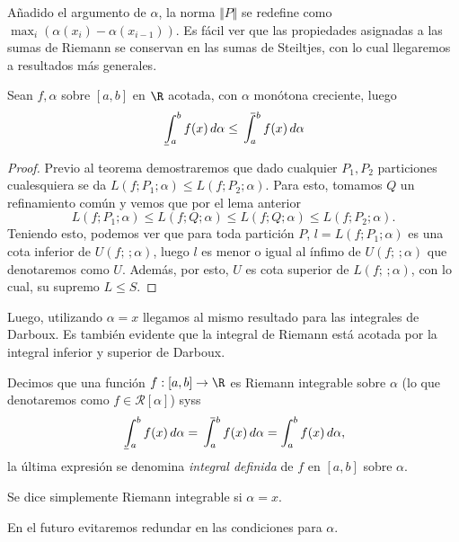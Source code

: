 \documentclass[11pt,oneside,a4paper]{book}
\def\upint{\mathchoice%
    {\mkern13mu\overline{\vphantom{\intop}\mkern7mu}\mkern-20mu}%
    {\mkern7mu\overline{\vphantom{\intop}\mkern7mu}\mkern-14mu}%
    {\mkern7mu\overline{\vphantom{\intop}\mkern7mu}\mkern-14mu}%
    {\mkern7mu\overline{\vphantom{\intop}\mkern7mu}\mkern-14mu}%
  \int}
\def\lowint{\mkern3mu\underline{\vphantom{\intop}\mkern7mu}\mkern-10mu\int}
\begin{document}
Añadido el argumento de $\alpha$, la norma $\Vert P\Vert$ se redefine como $\max_i(\alpha(x_i)-\alpha(x_{i-1}))$. Es fácil ver que las propiedades asignadas a las sumas de Riemann se conservan en las sumas de Steiltjes, con lo cual llegaremos a resultados más generales.
\begin{thm}
Sean $f,\alpha$ sobre $[a,b]$ en $\R$ acotada, con $\alpha$ monótona creciente, luego
$$\lowint_a^bf(x)\,d\alpha\leq\upint_a^bf(x)\,d\alpha$$
\end{thm}
\begin{proof}
Previo al teorema demostraremos que dado cualquier $P_1,P_2$ particiones cualesquiera se da $L(f;P_1;\alpha)\leq L(f;P_2;\alpha)$. Para esto, tomamos $Q$ un refinamiento común y vemos que por el lema anterior
$$L(f;P_1;\alpha)\leq L(f;Q;\alpha)\leq L(f;Q;\alpha)\leq L(f;P_2;\alpha).$$
Teniendo esto, podemos ver que para toda partición $P$, $l=L(f;P_1;\alpha)$ es una cota inferior de $U(f;\,;\alpha)$, luego $l$ es menor o igual al ínfimo de $U(f;\,;\alpha)$ que denotaremos como $U$. Además, por esto, $U$ es cota superior de $L(f;\,;\alpha)$, con lo cual, su supremo $L\leq S$.
\end{proof}
Luego, utilizando $\alpha=x$ llegamos al mismo resultado para las integrales de Darboux. Es también evidente que la integral de Riemann está acotada por la integral inferior y superior de Darboux.
\begin{mydef}
Decimos que una función $f:[a,b]\rightarrow\R$ es Riemann integrable sobre $\alpha$ (lo que denotaremos como $f\in\mathscr{R}[\alpha]$) syss
$$\lowint_a^bf(x)\,d\alpha=\upint_a^bf(x)\,d\alpha=\int_a^bf(x)\,d\alpha,$$
la última expresión se denomina \textit{integral definida} de $f$ en $[a,b]$ sobre $\alpha$.

Se dice simplemente Riemann integrable si $\alpha=x$.
\end{mydef}
En el futuro evitaremos redundar en las condiciones para $\alpha$.
\end{document}
